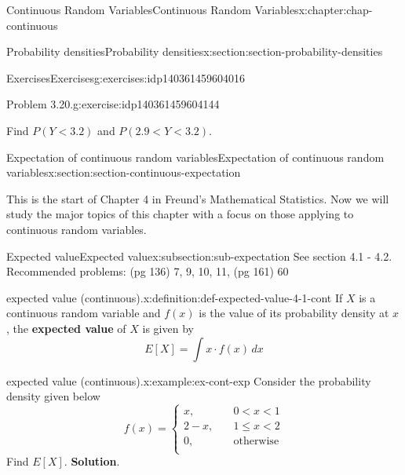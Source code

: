 \documentclass[oneside,10pt,]{book}
\newcommand{\blocktitlefont}{\relax}
\newcommand{\terminology}[1]{\textbf{#1}}
\numberwithin{equation}{section}
\newcommand{\lt}{<}
\newcommand{\amp}{&}
\begin{document}
\begin{chapterptx}{Continuous Random Variables}{}{Continuous Random Variables}{}{}{x:chapter:chap-continuous}
\begin{sectionptx}{Probability densities}{}{Probability densities}{}{}{x:section:section-probability-densities}
\begin{exercises-subsection}{Exercises}{}{Exercises}{}{}{g:exercises:idp140361459604016}
\begin{divisionexercise}{1}{Problem 3.20.}{}{g:exercise:idp140361459604144}
\begin{equation*}
\end{equation*}
%
\par
Find \(P(Y \lt 3.2)\) and \(P(2.9 \lt Y \lt 3.2)\).%
\end{divisionexercise}%
\end{exercises-subsection}
\end{sectionptx}
%
%
\typeout{************************************************}
\typeout{************************************************}
%
\begin{sectionptx}{Expectation of continuous random variables}{}{Expectation of continuous random variables}{}{}{x:section:section-continuous-expectation}
\begin{introduction}{}%
This is the start of Chapter 4 in Freund's Mathematical Statistics. Now we will study the major topics of this chapter with a focus on those applying to continuous random variables.%
\end{introduction}%
%
%
\typeout{************************************************}
\typeout{************************************************}
%
\begin{subsectionptx}{Expected value}{}{Expected value}{}{}{x:subsection:sub-expectation}
See section 4.1 - 4.2. Recommended problems: (pg 136) 7, 9, 10, 11, (pg 161) 60%
\begin{definition}{expected value (continuous).}{x:definition:def-expected-value-4-1-cont}%
If \(X\) is a continuous random variable and \(f(x)\) is the value of its probability density at \(x\), the \terminology{expected value} of \(X\) is given by%
\begin{equation*}
E[X] = \int x\cdot f(x)\,dx
\end{equation*}
%
\end{definition}
\begin{example}{expected value (continuous).}{x:example:ex-cont-exp}%
Consider the probability density given below%
\begin{equation*}
f(x) = \begin{cases}x,
\amp \quad 0 \lt x \lt 1\\
2-x, \amp \quad 1 \le x \lt 2\\
0, \amp \quad \text{otherwise}\\
\end{cases}
\end{equation*}
Find \(E[X]\).%
\textbf{\blocktitlefont Solution}.\quad{}%
\begin{equation*}

\end{equation*}
\end{example}
\end{subsectionptx}
\end{sectionptx}
\end{chapterptx}
\end{document}
